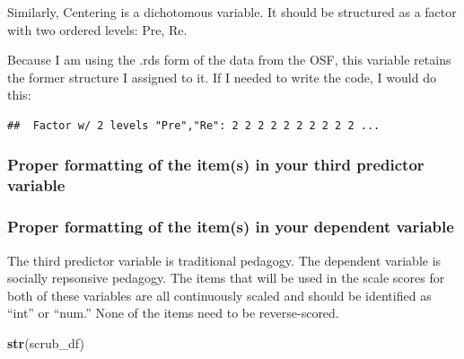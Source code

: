 \documentclass[
  11pt,
]{book}
\newenvironment{Shaded}{\begin{snugshade}}{\end{snugshade}}
\newcommand{\AttributeTok}[1]{\textcolor[rgb]{0.27,0.27,0.27}{#1}}
\newcommand{\FunctionTok}[1]{\textcolor[rgb]{0.27,0.27,0.27}{\textbf{#1}}}
\newcommand{\NormalTok}[1]{#1}
\newcommand{\OtherTok}[1]{\textcolor[rgb]{0.37,0.37,0.37}{#1}}
\newcommand{\SpecialCharTok}[1]{\textcolor[rgb]{0.43,0.43,0.43}{\textbf{#1}}}
\newcommand{\StringTok}[1]{\textcolor[rgb]{0.5,0.5,0.5}{#1}}
\begin{document}
Similarly, Centering is a dichotomous variable. It should be structured as a factor with two ordered levels: Pre, Re.

Because I am using the .rds form of the data from the OSF, this variable retains the former structure I assigned to it. If I needed to write the code, I would do this:

\begin{Shaded}
\end{Shaded}

\begin{verbatim}
##  Factor w/ 2 levels "Pre","Re": 2 2 2 2 2 2 2 2 2 2 ...
\end{verbatim}

\hypertarget{proper-formatting-of-the-items-in-your-third-predictor-variable}{%
\subsubsection*{Proper formatting of the item(s) in your third predictor variable}\label{proper-formatting-of-the-items-in-your-third-predictor-variable}}


\hypertarget{proper-formatting-of-the-items-in-your-dependent-variable}{%
\subsubsection*{Proper formatting of the item(s) in your dependent variable}\label{proper-formatting-of-the-items-in-your-dependent-variable}}


The third predictor variable is traditional pedagogy. The dependent variable is socially repsonsive pedagogy. The items that will be used in the scale scores for both of these variables are all continuously scaled and should be identified as ``int'' or ``num.'' None of the items need to be reverse-scored.

\begin{Shaded}
\begin{Highlighting}[]
\FunctionTok{str}\NormalTok{(scrub\_df)}
\end{Highlighting}
\end{Shaded}
\end{document}
